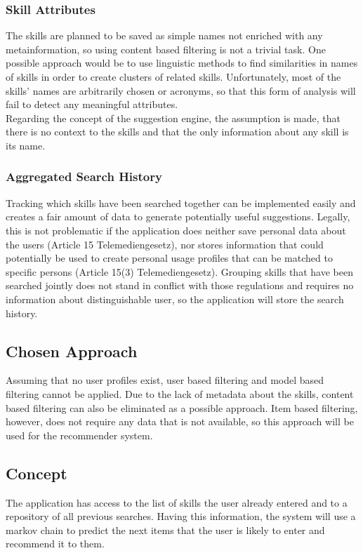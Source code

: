 \subsubsection{Skill Attributes}
The skills are planned to be saved as simple names not enriched with any metainformation, so using content based filtering is not a trivial task. One possible approach would be to use linguistic methods to find similarities in names of skills in order to create clusters of related skills. Unfortunately, most of the skills' names are arbitrarily chosen or acronyms, so that this form of analysis will fail to detect any meaningful attributes.\\
Regarding the concept of the suggestion engine, the assumption is made, that there is no context to the skills and that the only information about any skill is its name.

\subsubsection{Aggregated Search History}
Tracking which skills have been searched together can be implemented easily and creates a fair amount of data to generate potentially useful suggestions. Legally, this is not problematic if the application does neither save personal data about the users (Article 15 Telemediengesetz), nor stores information that could potentially be used to create personal usage profiles that can be matched to specific persons (Article 15(3) Telemediengesetz). Grouping skills that have been searched jointly does not stand in conflict with those regulations and requires no information about distinguishable user, so the application will store the search history.

\subsection{Chosen Approach}
Assuming that no user profiles exist, user based filtering and model based filtering cannot be applied. Due to the lack of metadata about the skills, content based filtering can also be eliminated as a possible approach. Item based filtering, however, does not require any data that is not available, so this approach will be used for the recommender system.

\subsection{Concept}
The application has access to the list of skills the user already entered and to a repository of all previous searches. Having this information, the system will use a markov chain to predict the next items that the user is likely to enter and recommend it to them.

